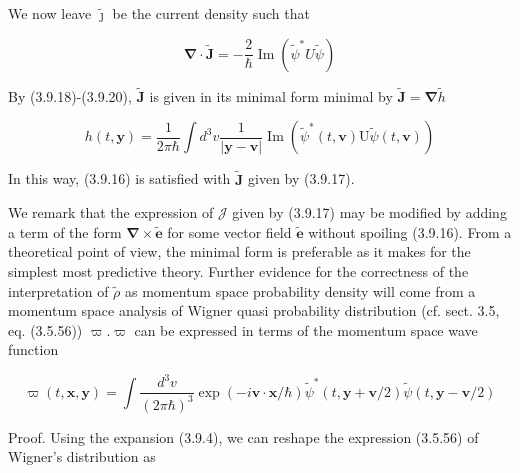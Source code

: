 \documentclass{article}
\begin{document}
We now leave $\tilde{\boldsymbol{\jmath}}$ be the current density such that
 
\begin{equation*}
\boldsymbol{\nabla} \cdot \tilde{\boldsymbol{J}}=-\frac{2}{\hbar} \operatorname{Im}\left(\tilde{\psi}^{*} U \tilde{\psi}\right) \tag{3.9.29}
\end{equation*}
 

By (3.9.18)-(3.9.20), $\tilde{\boldsymbol{J}}$ is given in its minimal form minimal by $\tilde{\boldsymbol{J}}=\boldsymbol{\nabla} \tilde{h}$
 
\begin{equation*}
h(t, \boldsymbol{y})=\frac{1}{2 \pi \hbar} \int d^{3} v \frac{1}{|\boldsymbol{y}-\boldsymbol{v}|} \operatorname{Im}\left(\tilde{\psi}^{*}(t, \boldsymbol{v}) \mathrm{U} \tilde{\psi}(t, \boldsymbol{v})\right) \tag{3.9.30}
\end{equation*}
 

In this way, (3.9.16) is satisfied with $\tilde{\boldsymbol{J}}$ given by (3.9.17).

We remark that the expression of $\boldsymbol{\mathcal { J }}$ given by (3.9.17) may be modified by adding a term of the form $\boldsymbol{\nabla} \times \tilde{\boldsymbol{e}}$ for some vector field $\tilde{\boldsymbol{e}}$ without spoiling (3.9.16). From a theoretical point of view, the minimal form is preferable as it makes for the
simplest most predictive theory.
Further evidence for the correctness of the interpretation of $\tilde{\rho}$ as momentum space probability density will come from a momentum space analysis of Wigner quasi probability distribution (cf. sect. 3.5, eq. (3.5.56)) $\varpi . \varpi$ can be expressed in terms of the momentum space wave function
 
\begin{equation*}
\varpi(t, \boldsymbol{x}, \boldsymbol{y})=\int \frac{d^{3} v}{(2 \pi \hbar)^{3}} \exp (-i \boldsymbol{v} \cdot \boldsymbol{x} / \hbar) \tilde{\psi}^{*}(t, \boldsymbol{y}+\boldsymbol{v} / 2) \tilde{\psi}(t, \boldsymbol{y}-\boldsymbol{v} / 2) \tag{3.9.31}
\end{equation*}
 

Proof. Using the expansion (3.9.4), we can reshape the expression (3.5.56) of Wigner's distribution as
 
\end{document}
